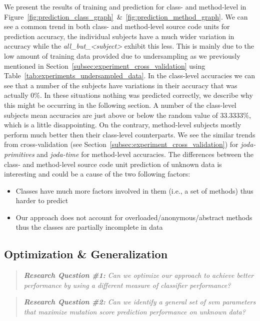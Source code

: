 We present the results of training and prediction for class- and method-level in Figure~\ref{fig:prediction_class_graph}~\&~\ref{fig:prediction_method_graph}. We can see a common trend in both class- and method-level source code units for prediction accuracy, the individual subjects have a much wider variation in accuracy while the \emph{all\_but\_<subject>} exhibit this less. This is mainly due to the low amount of training data provided due to undersampling as we previously mentioned in Section~\ref{subsec:experiment_cross_validation} using Table~\ref{tab:experiments_undersampled_data}. In the class-level accuracies we can see that a number of the subjects have variations in their accuracy that was actually 0\%. In these situations nothing was predicted correctly, we describe why this might be occurring in the following section. A number of the class-level subjects mean accuracies are just above or below the random value of 33.3333\%, which is a little disappointing. On the contrary, method-level subjects mostly perform much better then their class-level counterparts. We see the similar trends from cross-validation (see Section~\ref{subsec:experiment_cross_validation}) for \emph{joda-primitives} and \emph{joda-time} for method-level accuracies. The differences between the class- and method-level source code unit prediction of unknown data is interesting and could be a cause of the two following factors:

\begin{itemize}
  \item Classes have much more factors involved in them (i.e., a set of methods) thus harder to predict
  \item Our approach does not account for overloaded/anonymous/abstract methods thus the classes are partially incomplete in data
\end{itemize}


\subsection{Optimization \& Generalization}
\label{subsec:experiment_optimization_generalization}
\begin{quote}
	\emph{\textbf{Research Question \#1:} Can we optimize our approach to achieve better performance by using a different measure of classifier performance?}
\end{quote}

\begin{quote}
  \emph{\textbf{Research Question \#2:} Can we identify a general set of \gls{svm} parameters that maximize mutation score prediction performance on unknown data?}
\end{quote}

